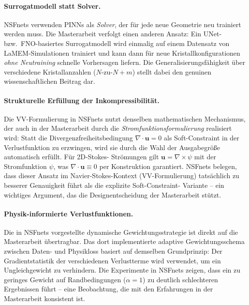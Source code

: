 \documentclass[a4paper,12pt]{article}
\begin{document}
\paragraph{Surrogatmodell statt Solver.}
NSFnets verwenden PINNs als \emph{Solver}, der für jede neue Geometrie
neu trainiert werden muss. Die Masterarbeit verfolgt einen anderen Ansatz:
Ein UNet- bzw.\ FNO-basiertes Surrogatmodell wird einmalig auf einem
Datensatz von LaMEM-Simulationen trainiert und kann dann für neue
Kristallkonfigurationen \emph{ohne Neutraining} schnelle Vorhersagen liefern.
Die Generalisierungsfähigkeit über verschiedene Kristallanzahlen ($N$-zu-$N+m$)
stellt dabei den genuinen wissenschaftlichen Beitrag dar.

\paragraph{Strukturelle Erfüllung der Inkompressibilität.}
Die VV-Formulierung in NSFnets nutzt denselben mathematischen Mechanismus,
der auch in der Masterarbeit durch die \emph{Stromfunktionsformulierung}
realisiert wird: Statt die Divergenzfreiheitsbedingung $\nabla \cdot
\mathbf{u} = 0$ als Soft-Constraint in der Verlustfunktion zu erzwingen,
wird sie durch die Wahl der Ausgabegröße automatisch erfüllt. Für 2D-Stokes-
Strömungen gilt $\mathbf{u} = \nabla \times \psi$ mit der Stromfunktion
$\psi$, was $\nabla \cdot \mathbf{u} \equiv 0$ per Konstruktion garantiert.
NSFnets belegen, dass dieser Ansatz im Navier-Stokes-Kontext (VV-Formulierung)
tatsächlich zu besserer Genauigkeit führt als die explizite Soft-Constraint-
Variante -- ein wichtiges Argument, das die Designentscheidung der Masterarbeit
stützt.

\paragraph{Physik-informierte Verlustfunktionen.}
Die in NSFnets vorgestellte dynamische Gewichtungsstrategie ist direkt auf die
Masterarbeit übertragbar. Das dort implementierte adaptive Gewichtungsschema
zwischen Daten- und Physikloss basiert auf demselben Grundprinzip: Der
Gradientstatistik der verschiedenen Verlustterme wird verwendet, um ein
Ungleichgewicht zu verhindern. Die Experimente in NSFnets zeigen, dass ein zu
geringes Gewicht auf Randbedingungen ($\alpha = 1$) zu deutlich schlechteren
Ergebnissen führt -- eine Beobachtung, die mit den Erfahrungen in der
Masterarbeit konsistent ist.
\end{document}
